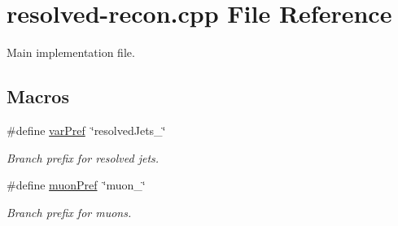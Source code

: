 \hypertarget{resolved-recon_8cpp}{}\section{resolved-\/recon.cpp File Reference}
\label{resolved-recon_8cpp}


Main implementation file.  


\subsection*{Macros}
\begin{DoxyCompactItemize}
\item 
\mbox{\label{resolved-recon_8cpp_af436b3dd5317917ed23f885395dcc717}} 
\#define \mbox{\hyperlink{resolved-recon_8cpp_af436b3dd5317917ed23f885395dcc717}{var\+Pref}}~\char`\"{}resolved\+Jets\+\_\+\char`\"{}
\begin{DoxyCompactList}\small\item\em Branch prefix for resolved jets. \end{DoxyCompactList}\item 
\mbox{\label{resolved-recon_8cpp_a645f118ca5e0fd82e68b1471c8a46e12}} 
\#define \mbox{\hyperlink{resolved-recon_8cpp_a645f118ca5e0fd82e68b1471c8a46e12}{muon\+Pref}}~\char`\"{}muon\+\_\+\char`\"{}
\begin{DoxyCompactList}\small\item\em Branch prefix for muons. \end{DoxyCompactList}\end{DoxyCompactItemize}
